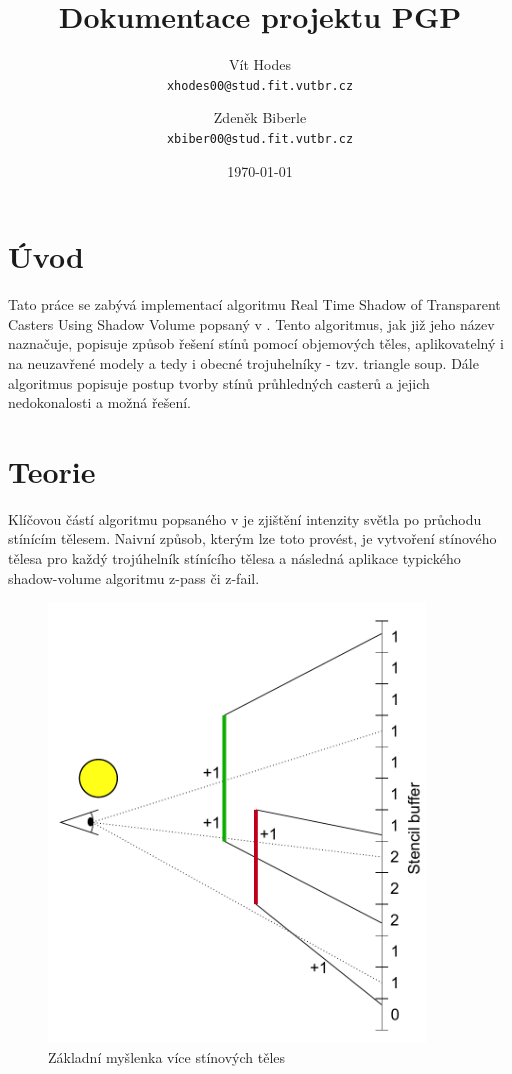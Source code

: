 \documentclass[a4paper, 12pt]{article}
\title{Dokumentace projektu PGP}
\author{
	Vít Hodes\\
	\texttt{xhodes00@stud.fit.vutbr.cz}
	\and
	Zdeněk Biberle\\
	\texttt{xbiber00@stud.fit.vutbr.cz}
}
\date{\today}
\begin{document}
\maketitle

\section{Úvod}


Tato práce se zabývá implementací algoritmu Real Time Shadow of Transparent Casters Using Shadow
Volume popsaný v \cite{Byungmoon2007}. Tento algoritmus, jak již jeho název naznačuje, popisuje způsob řešení stínů pomocí objemových těles, aplikovatelný i
na neuzavřené modely a tedy i obecné trojuhelníky - tzv. triangle soup. Dále algoritmus popisuje
postup tvorby stínů průhledných casterů a jejich nedokonalosti a možná řešení.


\section{Teorie}

Klíčovou částí algoritmu popsaného v \cite{Byungmoon2007} je zjištění intenzity světla po průchodu stínícím tělesem. Naivní způsob, kterým lze toto provést, je vytvoření stínového tělesa pro každý trojúhelník stínícího tělesa a následná aplikace typického shadow-volume algoritmu z-pass či z-fail.

\begin{figure}[H]
	\centering
	\includegraphics[width=10cm,keepaspectratio]{basic-shadow-volumes}
	\caption{Základní myšlenka více stínových těles}
	\label{fig:basic-shadow-volumes}
\end{figure}
\end{document}
